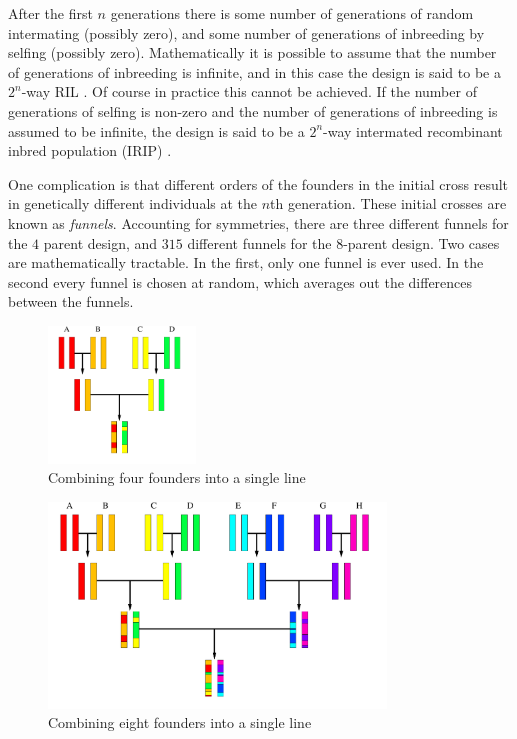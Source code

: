 \documentclass[a4paper, nojss, shortnames]{jss}\usepackage[]{graphicx}\usepackage[]{color}
\begin{document}
After the first $n$ generations there is some number of generations of random intermating (possibly zero), and some number of generations of inbreeding by selfing (possibly zero). Mathematically it is possible to assume that the number of generations of inbreeding is infinite, and in this case the design is said to be a $2^n$-way RIL \citep{Teuscher2007}. Of course in practice this cannot be achieved. If the number of generations of selfing is non-zero and the number of generations of inbreeding is assumed to be infinite, the design is said to be a $2^n$-way intermated recombinant inbred population (IRIP) \citep{Teuscher2007}.

One complication is that different orders of the founders in the initial cross result in genetically different individuals at the $n$th generation. These initial crosses are known as \emph{funnels}. Accounting for symmetries, there are three different funnels for the $4$ parent design, and $315$ different funnels for the 8-parent design. Two cases are mathematically tractable. In the first, only one funnel is ever used. In the second every funnel is chosen at random, which averages out the differences between the funnels.

\begin{figure}
\centering
\includegraphics[width=0.35\textwidth]{MAGIC4.pdf}
\caption{Combining four founders into a single line\label{fig:intercrossing_2}}
\end{figure}

\begin{figure}
\centering
\includegraphics[width=0.8\textwidth]{MAGIC8.pdf}
\caption{Combining eight founders into a single line\label{fig:intercrossing_3}}
\end{figure}
\end{document}

